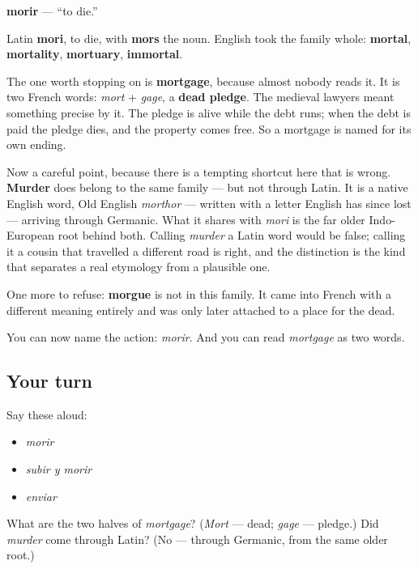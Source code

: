 \begin{cousinweb}
\textbf{morir} — \textquotedblleft{}to die.\textquotedblright{}

Latin \textbf{mori}, to die, with \textbf{mors} the noun. English took the family whole: \textbf{mortal}, \textbf{mortality}, \textbf{mortuary}, \textbf{immortal}.

The one worth stopping on is \textbf{mortgage}, because almost nobody reads it. It is two French words: \emph{mort} + \emph{gage}, a \textbf{dead pledge}. The medieval lawyers meant something precise by it. The pledge is alive while the debt runs; when the debt is paid the pledge dies, and the property comes free. So a mortgage is named for its own ending.

Now a careful point, because there is a tempting shortcut here that is wrong. \textbf{Murder} does belong to the same family — but not through Latin. It is a native English word, Old English \emph{morthor} — written with a letter English has since lost — arriving through Germanic. What it shares with \emph{mori} is the far older Indo-European root behind both. Calling \emph{murder} a Latin word would be false; calling it a cousin that travelled a different road is right, and the distinction is the kind that separates a real etymology from a plausible one.

One more to refuse: \textbf{morgue} is not in this family. It came into French with a different meaning entirely and was only later attached to a place for the dead.
\end{cousinweb}

\begin{grammarlens}[title={What you've built}]
You can now name the action: \emph{morir}. And you can read \emph{mortgage} as two words.
\end{grammarlens}

\subsection*{Your turn}
Say these aloud:

\begin{itemize}
\raggedright
  \item \emph{morir}
  \item \emph{subir y morir}
  \item \emph{enviar}
\end{itemize}

\begin{tcolorbox}[breakable,colback=teal!4,colframe=teal!35!black,title={Before you move on}]
What are the two halves of \emph{mortgage}? (\emph{Mort} — dead; \emph{gage} — pledge.) Did \emph{murder} come through Latin? (No — through Germanic, from the same older root.)
\end{tcolorbox}
